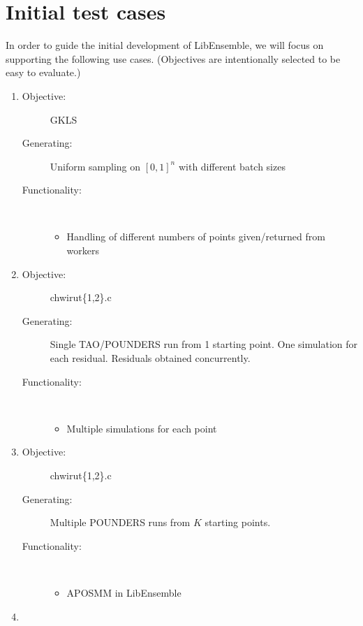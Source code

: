 \documentclass{article}
\begin{document}
\section{Initial test cases}
In order to guide the initial development of LibEnsemble, we will focus on supporting the following use cases. (Objectives are intentionally selected to be easy to evaluate.)
\begin{enumerate}
  \item 
    \begin{description}
      \item[Objective:] GKLS
      \item[Generating:] Uniform sampling on $[0,1]^n$ with different batch sizes
      \item[Functionality:] \
        \begin{itemize}
          \item Handling of different numbers of points given/returned from workers
        \end{itemize}
    \end{description}
    \bigskip
  \item 
    \begin{description}
      \item[Objective:] chwirut\{1,2\}.c 
      \item[Generating:] Single TAO/POUNDERS run from 1 starting point. One simulation for each residual. Residuals obtained concurrently.
      \item[Functionality:] \
        \begin{itemize}
          \item Multiple simulations for each point
        \end{itemize}
    \end{description}
    \bigskip
  \item 
    \begin{description}
      \item[Objective:] chwirut\{1,2\}.c
      \item[Generating:] Multiple POUNDERS runs from $K$ starting points.
      \item[Functionality:] \
        \begin{itemize}
          \item APOSMM in LibEnsemble
        \end{itemize}
    \end{description}
    \bigskip
  \item 
    \begin{description}

\end{description}
\end{enumerate}
\end{document}
